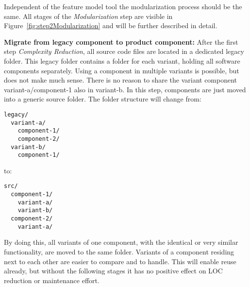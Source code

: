 Independent of the feature model tool the modularization process should be the
same. All stages of the \textit{Modularization} step are visible in
Figure~\ref{fig:step2Modularization} and will be further described in detail.

\textbf{Migrate from legacy component to product component:} After the first
step \textit{Complexity Reduction}, all source code files are located in a
dedicated legacy folder. This legacy folder contains a folder for each
variant, holding all software components separately. Using a component in
multiple variants is possible, but does not make much sense. There is no reason
to share the variant component variant-a/component-1 also in variant-b. In this
step, components are just moved into a generic source folder. The folder
structure will change from:
\begin{Verbatim}[frame=single,samepage=true]
legacy/
  variant-a/
    component-1/
    component-2/
  variant-b/
    component-1/
\end{Verbatim}
to:
\begin{Verbatim}[frame=single,samepage=true]
src/
  component-1/
    variant-a/
    variant-b/
  component-2/
    variant-a/
\end{Verbatim}
By doing this, all variants of one component, with the identical or very similar
functionality, are moved to the same folder. Variants of a component residing
next to each other are easier to compare and to handle. This will enable reuse
already, but without the following stages it has no positive effect on LOC
reduction or maintenance effort.

